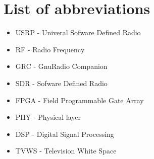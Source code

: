 \section*{List of abbreviations}



\begin{itemize}
\tightlist
\item
  USRP - Univeral Sofware Defined Radio
\item
  RF - Radio Frequency
\item
  GRC - GnuRadio Companion
\item
  SDR - Sofware Defined Radio
\item
  FPGA - Field Programmable Gate Array
\item
  PHY - Physical layer
\item
  DSP - Digital Signal Processing
\item
  TVWS - Television White Space
\end{itemize}
